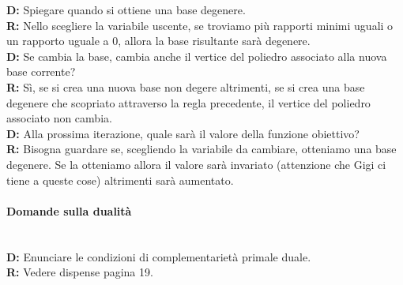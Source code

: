 \documentclass[10pt,                    %
               a4paper,                 %
               twoside,                 %
               openright,               %
               english,                 
               italian,                 
]{article}
\begin{document}
\textbf{D:} Spiegare quando si ottiene una base degenere. \\
\textbf{R:} Nello scegliere la variabile uscente, se troviamo più rapporti minimi uguali o un rapporto uguale a 0, allora la base risultante sarà degenere. \\

\textbf{D:} Se cambia la base, cambia anche il vertice del poliedro associato alla nuova base corrente? \\
\textbf{R:} Sì, se si crea una nuova base non degere altrimenti, se si crea una base degenere che scopriato attraverso la regla precedente, il vertice del poliedro associato non cambia. \\

\textbf{D:} Alla prossima iterazione, quale sarà il valore della funzione obiettivo? \\
\textbf{R:} Bisogna guardare se, scegliendo la variabile da cambiare, otteniamo una base degenere. Se la otteniamo allora il valore sarà invariato (attenzione che Gigi ci tiene a queste cose) altrimenti sarà aumentato. \\

\paragraph{Domande sulla dualità} \mbox{} \\
\textbf{D:} Enunciare le condizioni di complementarietà primale duale. \\
\textbf{R:} Vedere dispense pagina 19.  \\ 
\end{document}
